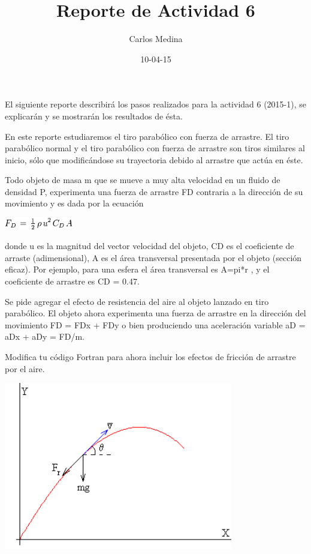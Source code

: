 \documentclass[12pt]{article}
\title{Reporte de Actividad 6}
\author{Carlos Medina}
\date{10-04-15}
\begin{document}
\maketitle


El siguiente reporte describirá los pasos realizados para la actividad 6 (2015-1), se explicarán y se mostrarán los resultados de ésta.




\hspace {0.5cm} En este reporte estudiaremos el tiro parabólico con fuerza de arrastre. El tiro parabólico normal y el tiro parabólico con fuerza de arrastre son tiros similares al inicio, sólo que modificándose su trayectoria debido al arrastre que actúa en éste.

Todo objeto de masa m que se mueve a muy alta velocidad en un fluido de densidad P,  experimenta una fuerza de arrastre FD  contraria a la dirección de su movimiento y es  dada por la ecuación
 
\begin{center}
	\includegraphics[width=3cm]{Ec1.png}\\
\end{center}
 
donde u es la magnitud del vector velocidad del objeto, CD es  el coeficiente de arraste (adimensional), A es el área transversal presentada por el objeto (sección eficaz). Por ejemplo, para una esfera el área transversal es A=pi*r , y  el coeficiente de arrastre es CD = 0.47.
 
Se pide agregar el efecto de resistencia del aire al objeto lanzado en tiro parabólico. El objeto ahora experimenta una fuerza de arrastre en la dirección del movimiento FD = FDx + FDy  o bien produciendo una aceleración variable aD = aDx + aDy = FD/m.
 
Modifica tu código Fortran para ahora incluir los efectos de fricción de arrastre por el aire. 

\begin{center}
	\includegraphics[width=10cm]{Im1.png}\\
\end{center}
 
\end{document}
